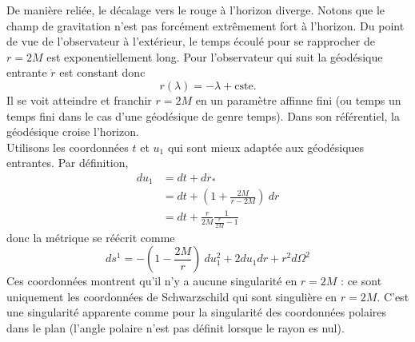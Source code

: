 \documentclass[a4paper,11pt]{report}
\theoremstyle{definition}
\theoremstyle{plain}
\theoremstyle{definition}
\theoremstyle{remark}
\begin{document}
            
            De manière reliée, le décalage vers le rouge à l'horizon diverge. Notons que le champ de gravitation n'est pas forcément extrêmement fort à l'horizon. Du point de vue de l'observateur à l'extérieur, le temps écoulé pour se rapprocher de $r=2M$ est exponentiellement long. Pour l'observateur qui suit la géodésique entrante $\dot{r}$ est constant donc
            \begin{equation}
                r(\lambda) = -\lambda+\text{cste}.
            \end{equation}
            Il se voit atteindre et franchir $r=2M$ en un paramètre affinne fini (ou temps un temps fini dans le cas d'une géodésique de genre temps). Dans son référentiel, la géodésique croise l'horizon.\\
            
            Utilisons les coordonnées $t$ et $u_1$ qui sont mieux adaptée aux géodésiques entrantes. Par définition, 
            \begin{align}
                du_1 &= dt+dr_*\\
                &= dt + \left( 1+\frac{2M}{r-2M} \right)~dr\\
                &= dt +\frac{r}{2M}\frac{1}{\frac{r}{2M}-1}
            \end{align}
            donc la métrique se réécrit comme
            \begin{equation}
                ds^1 = -\left( 1-\frac{2M}{r} \right)~du^2_1 + 2du_1dr+r^2d\Omega^2
            \end{equation}
            Ces coordonnées montrent qu'il n'y a aucune singularité en $r=2M$ : ce sont uniquement les coordonnées de Schwarzschild qui sont singulière en $r=2M$. C'est une singularité apparente comme pour la singularité des coordonnées polaires dans le plan (l'angle polaire n'est pas définit lorsque le rayon es nul).\\
            
            
\end{document}
